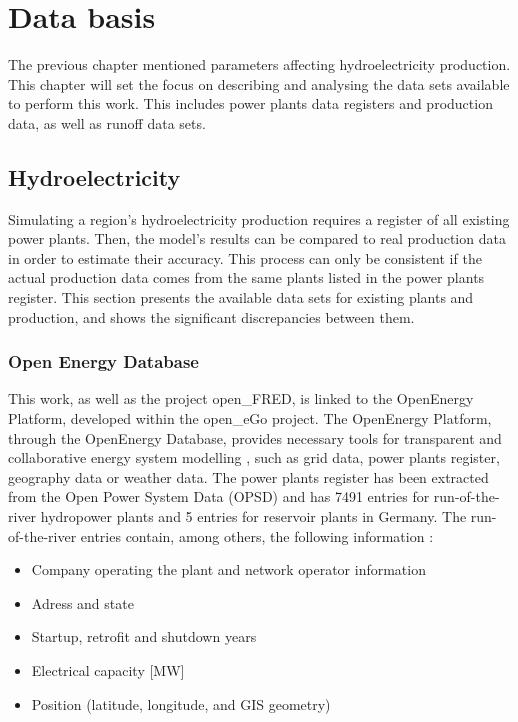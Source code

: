 \chapter{Data basis}
\label{chap:data_basis}

The previous chapter mentioned parameters affecting hydroelectricity production. This chapter will set the focus on describing and analysing the data sets available to perform this work. This includes power plants data registers and production data, as well as runoff data sets. 

\section{Hydroelectricity}
\label{sec:db_hydroelec}
Simulating a region's hydroelectricity production requires a register of all existing power plants. Then, the model's results can be compared to real production data in order to estimate their accuracy. This process can only be consistent if the actual production data comes from the same plants listed in the power plants register. This section presents the available data sets for existing plants and production, and shows the significant discrepancies between them. 

\subsection{Open Energy Database}
\label{sub:hpp_reg}
This work, as well as the project open\_FRED, is linked to the OpenEnergy Platform, developed within the open\_eGo project. The OpenEnergy Platform, through the OpenEnergy Database, provides necessary tools for transparent and collaborative energy system modelling \cite{oedb}, such as grid data, power plants register, geography data or weather data. The power plants register has been extracted from the Open Power System Data (OPSD) \cite{opsd} and has 7491 entries for run-of-the-river hydropower plants and 5 entries for reservoir plants in Germany. The run-of-the-river entries contain, among others, the following information :
\begin{itemize}
\itemsep-0.5em 
 \item Company operating the plant and network operator information
 \item Adress and state
 \item Startup, retrofit and shutdown years
 \item Electrical capacity [\unit{MW}]
 \item Position (latitude, longitude, and GIS geometry)
\end{itemize}


